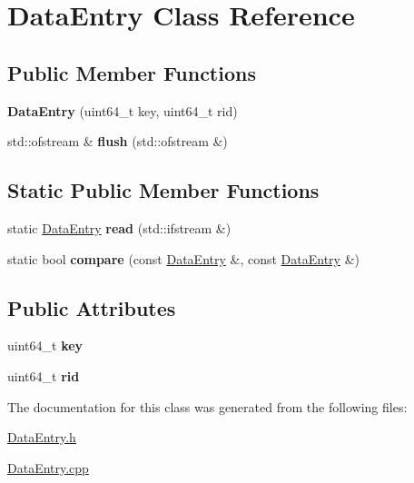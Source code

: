 \hypertarget{class_data_entry}{}\section{Data\+Entry Class Reference}
\label{class_data_entry}
\subsection*{Public Member Functions}
\begin{DoxyCompactItemize}
\item 
\hypertarget{class_data_entry_a0d20734367005c32bad60abae1bcb868}{}{\bfseries Data\+Entry} (uint64\+\_\+t key, uint64\+\_\+t rid)\label{class_data_entry_a0d20734367005c32bad60abae1bcb868}

\item 
\hypertarget{class_data_entry_a597fe1d7653e79918ab8cfeabd1da57b}{}std\+::ofstream \& {\bfseries flush} (std\+::ofstream \&)\label{class_data_entry_a597fe1d7653e79918ab8cfeabd1da57b}

\end{DoxyCompactItemize}
\subsection*{Static Public Member Functions}
\begin{DoxyCompactItemize}
\item 
\hypertarget{class_data_entry_a02516b02707526ca11dd1cd775c7c975}{}static \hyperlink{class_data_entry}{Data\+Entry} {\bfseries read} (std\+::ifstream \&)\label{class_data_entry_a02516b02707526ca11dd1cd775c7c975}

\item 
\hypertarget{class_data_entry_a236728047791957003f7d5a5a4119875}{}static bool {\bfseries compare} (const \hyperlink{class_data_entry}{Data\+Entry} \&, const \hyperlink{class_data_entry}{Data\+Entry} \&)\label{class_data_entry_a236728047791957003f7d5a5a4119875}

\end{DoxyCompactItemize}
\subsection*{Public Attributes}
\begin{DoxyCompactItemize}
\item 
\hypertarget{class_data_entry_a24e99174686a8a5d1a8b16d38a6643b2}{}uint64\+\_\+t {\bfseries key}\label{class_data_entry_a24e99174686a8a5d1a8b16d38a6643b2}

\item 
\hypertarget{class_data_entry_a426757efaaa25ac81e66479cc807f4be}{}uint64\+\_\+t {\bfseries rid}\label{class_data_entry_a426757efaaa25ac81e66479cc807f4be}

\end{DoxyCompactItemize}


The documentation for this class was generated from the following files\+:\begin{DoxyCompactItemize}
\item 
\hyperlink{_data_entry_8h}{Data\+Entry.\+h}\item 
\hyperlink{_data_entry_8cpp}{Data\+Entry.\+cpp}\end{DoxyCompactItemize}
